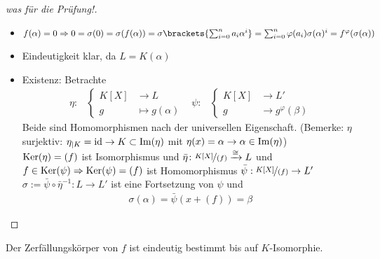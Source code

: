 \begin{proof}[was für die Prüfung!]\leavevmode\vspace*{\dimexpr-\baselineskip+2\lineskip}
	\begin{itemize}
		\item $f(\alpha) = 0 \Rightarrow 0 = \sigma(0) = \sigma(f(\alpha)) = \sigma\brackets{\sum_{i=0}^n a_i \alpha^i} = \sum_{i=0}^n \varphi(a_i)\sigma(\alpha)^i = f^{\varphi}(\sigma(\alpha))$
		\item Eindeutigkeit klar, da $L=K(\alpha)$
		\item Existenz: Betrachte 
		\begin{align*}
			\eta\colon&
			\begin{cases}
				K[X] &\to L\\
				g &\mapsto g(\alpha)
			\end{cases}&
			\psi\colon&
			\begin{cases}
				K[X] &\to L'\\
				g &\to g^{\varphi}(\beta) 
			\end{cases}
		\end{align*}
		Beide sind Homomorphismen nach der universellen Eigenschaft.
		(Bemerke: $\eta$ surjektiv: $\eta_{\mid K} = \operatorname{id} \to K \subset \operatorname{Im}(\eta)$ mit $\eta(x) = \alpha \to \alpha \in \operatorname{Im}(\eta)$)\\
		$\operatorname{Ker}(\eta)=(f)$ ist Isomorphismus und $\bar{\eta}\colon \lnkset{K[X]}{(f)} \xrightarrow{\cong}L$ und\\
		$f \in \operatorname{Ker}(\psi) \Rightarrow \operatorname{Ker}(\psi) = (f)$ ist Homomorphismus $\bar{\psi}: \lnkset{K[X]}{(f)} \to L'$\\
		$\sigma:= \bar{\psi}\circ \bar{\eta}^{-1}: L \to L'$ ist eine Fortsetzung von $\psi$ und
		\begin{align*}
			\sigma(\alpha) = \bar{\psi}(x+(f)) = \beta
		\end{align*}
	\end{itemize}
\end{proof}
\begin{proposition}
	Der Zerfällungskörper von $f$ ist eindeutig bestimmt bis auf $K$-Isomorphie.
\end{proposition}
